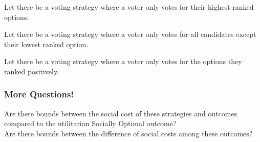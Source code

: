 \documentclass{article}
\begin{document}
Let there be a voting strategy where a voter only votes for their highest ranked options.

Let there be a voting strategy where a voter only votes for all candidates except their lowest ranked option.

Let there be a voting strategy where a voter only votes for the options they ranked positively.

\subsubsection{More Questions!}

Are there bounds between the social cost of these strategies and outcomes compared to the utilitarian Socially Optimal outcome?\\
Are there bounds between the difference of social costs among these outcomes?
\end{document}
